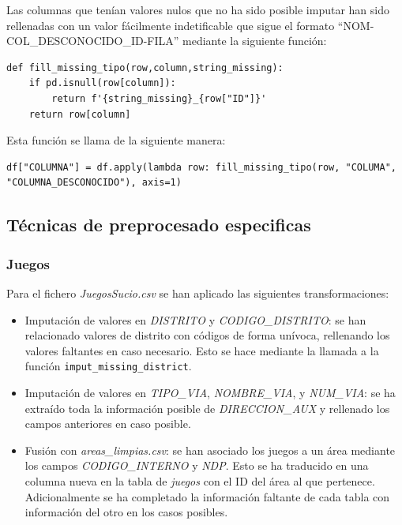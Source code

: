 \documentclass[]{article}
\begin{document}
\begin{itemize}
    Las columnas que tenían valores nulos que no ha sido posible imputar han sido rellenadas con un valor fácilmente indetificable que sigue el formato ``NOM-COL\_DESCONOCIDO\_ID-FILA'' mediante la siguiente función:

    \begin{lstlisting}
def fill_missing_tipo(row,column,string_missing):
    if pd.isnull(row[column]):
        return f'{string_missing}_{row["ID"]}'
    return row[column]
    \end{lstlisting}

    Esta función se llama de la siguiente manera:

    \begin{lstlisting}
df["COLUMNA"] = df.apply(lambda row: fill_missing_tipo(row, "COLUMA", "COLUMNA_DESCONOCIDO"), axis=1)
    \end{lstlisting}

\end{itemize}

\subsection{Técnicas de preprocesado especificas}
\label{subsec:preprocessespecifico}

\subsubsection{Juegos}
\label{subsubsec:preprocessjuego}
Para el fichero \textit{JuegosSucio.csv} se han aplicado las siguientes transformaciones:

\begin{itemize}
    \item Imputación de valores en \textit{DISTRITO} y \textit{CODIGO\_DISTRITO}: se han relacionado valores de distrito con códigos de forma unívoca, rellenando los valores faltantes en caso necesario. Esto se hace mediante la llamada a la función \texttt{imput\_missing\_district}.
    \item Imputación de valores en \textit{TIPO\_VIA}, \textit{NOMBRE\_VIA}, y \textit{NUM\_VIA}: se ha extraído toda la información posible de \textit{DIRECCION\_AUX} y rellenado los campos anteriores en caso posible.
    \item Fusión con \textit{areas\_limpias.csv}: se han asociado los juegos a un área mediante los campos \textit{CODIGO\_INTERNO} y \textit{NDP}. Esto se ha traducido en una columna nueva en la tabla de \textit{juegos} con el ID del área al que pertenece. Adicionalmente se ha completado la información faltante de cada tabla con información del otro en los casos posibles.
\end{itemize}
\end{document}
